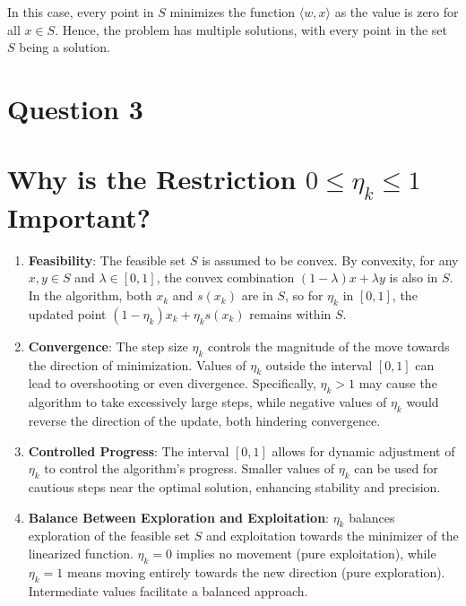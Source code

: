 \documentclass[12p]{article}
\begin{document}
In this case, every point in \( S \) minimizes the function \( \langle w, x \rangle \) as the value is zero for all \( x \in S \). Hence, the problem has multiple solutions, with every point in the set \( S \) being a solution.

\section*{Question 3} 

\section*{Why is the Restriction \( 0 \leq \eta_k \leq 1 \) Important?}

\begin{enumerate}
    \item \textbf{Feasibility}: The feasible set \( S \) is assumed to be convex. By convexity, for any \( x, y \in S \) and \( \lambda \in [0, 1] \), the convex combination \( (1-\lambda)x + \lambda y \) is also in \( S \). In the algorithm, both \( x_k \) and \( s(x_k) \) are in \( S \), so for \( \eta_k \) in \( [0, 1] \), the updated point \( (1-\eta_k)x_k + \eta_k s(x_k) \) remains within \( S \).

    \item \textbf{Convergence}: The step size \( \eta_k \) controls the magnitude of the move towards the direction of minimization. Values of \( \eta_k \) outside the interval \( [0, 1] \) can lead to overshooting or even divergence. Specifically, \( \eta_k > 1 \) may cause the algorithm to take excessively large steps, while negative values of \( \eta_k \) would reverse the direction of the update, both hindering convergence.

    \item \textbf{Controlled Progress}: The interval \( [0, 1] \) allows for dynamic adjustment of \( \eta_k \) to control the algorithm’s progress. Smaller values of \( \eta_k \) can be used for cautious steps near the optimal solution, enhancing stability and precision.

    \item \textbf{Balance Between Exploration and Exploitation}: \( \eta_k \) balances exploration of the feasible set \( S \) and exploitation towards the minimizer of the linearized function. \( \eta_k = 0 \) implies no movement (pure exploitation), while \( \eta_k = 1 \) means moving entirely towards the new direction (pure exploration). Intermediate values facilitate a balanced approach.
\end{enumerate}
\end{document}
